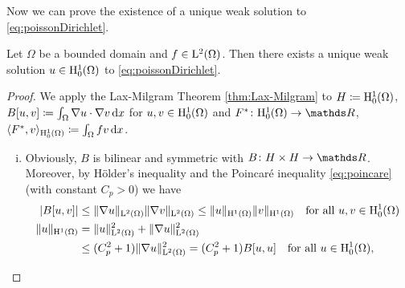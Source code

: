 Now we can prove the existence of a unique weak solution to \eqref{eq:poissonDirichlet}.

\begin{thm}
  Let $\Omega$ be a bounded domain and $f \in \mathrm{L}^2(\Omega)$.
  Then there exists a unique weak solution $u \in \mathrm{H}_0^1(\Omega)$ to \eqref{eq:poissonDirichlet}.
\end{thm}

\begin{proof}
  We apply the Lax-Milgram Theorem \ref{thm:Lax-Milgram} to $H \coloneqq \mathrm{H}_0^1(\Omega)$, $B[u,v] \coloneqq \int_\Omega \nabla u \cdot \nabla v \, {\operatorname{d}\!{x}}$ for $u,v \in \mathrm{H}_0^1(\Omega)$ and $F^* \colon \HH_0^1(\Omega) \to \R$, $\langle F^*, v \rangle_{\mathrm{H}_0^1(\Omega)} \coloneqq \int_\Omega f v \, {\operatorname{d}\!{x}}$.
  \begin{enumerate}[i)]
    \item Obviously, $B$ is bilinear and symmetric with $B \colon H \times H \to \R$.
      Moreover, by Hölder's inequality and the Poincar\'e inequality \eqref{eq:poincare} (with constant $C_p > 0$) we have
      \begin{align*}
        |B[u,v]| 
        &\leq \|\nabla u\|_{\mathrm{L}^2(\Omega)} \|\nabla v\|_{\mathrm{L}^2(\Omega)}
        \leq \|u\|_{\mathrm{H}^1(\Omega)} \|v\|_{\mathrm{H}^1(\Omega)} \quad\text{for all } u, v \in \mathrm{H}_0^1(\Omega) \\
        \|u\|_{\mathrm{H}^1(\Omega)} &= \|u\|_{\mathrm{L}^2(\Omega)}^2 + \|\nabla u\|_{\mathrm{L}^2(\Omega)}^2 \\
        &\leq (C_p^2 + 1) \|\nabla u\|_{\mathrm{L}^2(\Omega)}^2  
        = (C_p^2 + 1) B[u,u] \quad\text{for all } u \in \mathrm{H}_0^1(\Omega),
      \end{align*}
  \end{enumerate}
\end{proof}
